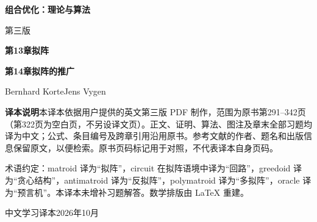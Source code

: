 \documentclass[UTF8,11pt,a4paper,fontset=windows]{ctexart}
\begin{document}
\begin{titlepage}\centering\vspace*{25mm}
{\Huge\bfseries 组合优化：理论与算法\par}\vspace{8mm}
{\Large 第三版\par}\vspace{17mm}
{\LARGE\bfseries 第13章\quad 拟阵\par}\vspace{5mm}
{\LARGE\bfseries 第14章\quad 拟阵的推广\par}\vspace{15mm}
{\large Bernhard Korte\quad Jens Vygen\par}\vfill
\begin{minipage}{0.88\textwidth}\small
\textbf{译本说明}\quad 本译本依据用户提供的英文第三版 PDF 制作，范围为原书第291--342页（第322页为空白页，不另设译文页）。正文、证明、算法、图注及章末全部习题均译为中文；公式、条目编号及跨章引用沿用原书。参考文献的作者、题名和出版信息保留原文，以便检索。原书页码标记用于对照，不代表译本自身页码。\par
术语约定：matroid 译为“拟阵”，circuit 在拟阵语境中译为“回路”，greedoid 译为“贪心结构”，antimatroid 译为“反拟阵”，polymatroid 译为“多拟阵”，oracle 译为“预言机”。本译本未增补习题解答。数学排版由 LaTeX 重建。\par
\end{minipage}\vspace{12mm}
{\small 中文学习译本\quad 2026年10月}
\end{titlepage}
\tableofcontents


\end{document}
